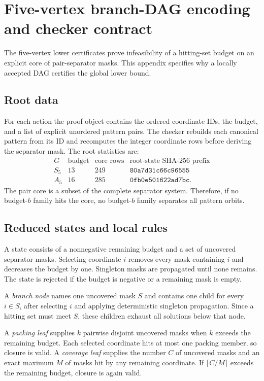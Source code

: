 \section{Five-vertex branch-DAG encoding and checker contract}
\label{app:n5-dag}

The five-vertex lower certificates prove infeasibility of a hitting-set budget
on an explicit core of pair-separator masks.  This appendix specifies why a
locally accepted DAG certifies the global lower bound.

\subsection{Root data}

For each action the proof object contains the ordered coordinate IDs, the
budget, and a list of explicit unordered pattern pairs.  The checker rebuilds
each canonical pattern from its ID and recomputes the integer coordinate rows
before deriving the separator mask.  The root statistics are:
\[
\begin{array}{c|r|r|l}
G & \text{budget} & \text{core rows} & \text{root-state SHA-256 prefix}\\ \hline
S_5 & 13 & 249 & \texttt{80a7d31c66c96555}\\
A_5 & 16 & 285 & \texttt{0fb0e501622ad7bc}.
\end{array}
\]
The pair core is a subset of the complete separator system.  Therefore, if no
budget-$b$ family hits the core, no budget-$b$ family separates all pattern
orbits.

\subsection{Reduced states and local rules}

A state consists of a nonnegative remaining budget and a set of uncovered
separator masks.  Selecting coordinate $i$ removes every mask containing
$i$ and decreases the budget by one.  Singleton masks are propagated until
none remains.  The state is rejected if the budget is negative or a remaining
mask is empty.

A \emph{branch node} names one uncovered mask $S$ and contains one child for
every $i\in S$, after selecting $i$ and applying deterministic singleton
propagation.  Since a hitting set must meet $S$, these children exhaust all
solutions below that node.

A \emph{packing leaf} supplies $k$ pairwise disjoint uncovered masks when
$k$ exceeds the remaining budget.  Each selected coordinate hits at most one
packing member, so closure is valid.  A \emph{coverage leaf} supplies the
number $C$ of uncovered masks and an exact maximum $M$ of masks hit by any
remaining coordinate.  If $\lceil C/M\rceil$ exceeds the remaining budget,
closure is again valid.

